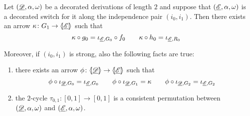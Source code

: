 \begin{lemma}\label{lem:switchtoperm}
	Let $(\underline{\mathscr{D}}, \alpha, \omega)$ be a decorated derivations of length $2$ and suppose that $(\underline{\mathscr{E}}, \alpha, \omega)$ is a decorated switch for it along the independence pair $(i_0, i_1)$. Then there exists an arrow $\kappa\colon G_1\to \langle \hspace{-1.85pt}[ \underline{\mathscr{E}}]\hspace{-1.85pt}\rangle$ such that 
		\[\kappa \circ g_{0} = \iota_{\underline{\mathscr{E}}, G_0}\circ f_{0} \qquad \kappa\circ h_{0}= \iota_{\underline{\mathscr{E}}, R_0}\]
		
		Moreover, if $(i_0, i_1)$ is strong, also the following facts are true:
		\begin{enumerate}
		\item there exists an arrow $\phi\colon \langle \hspace{-1.85pt}[ \underline{\mathscr{D}}]\hspace{-1.85pt}\rangle\to \langle \hspace{-1.85pt}[ \underline{\mathscr{E}}]\hspace{-1.85pt}\rangle$ such that
		\[\phi \circ \iota_{\underline{\mathscr{D}}, G_0}=\iota_{\underline{\mathscr{E}}, G_0} \qquad \phi \circ \iota_{\underline{\mathscr{D}}, G_1}=\kappa \qquad \phi \circ \iota_{\underline{\mathscr{D}}, G_2}=\iota_{\underline{\mathscr{E}}, G_2}\]
		\item the $2$-cycle $\tau_{0,1}\colon [0,1]\to [0,1]$ is a consistent permutation between $(\underline{\mathscr{D}}, \alpha, \omega)$ and $(\underline{\mathscr{E}}, \alpha, \omega)$.
	\end{enumerate}
\end{lemma}
